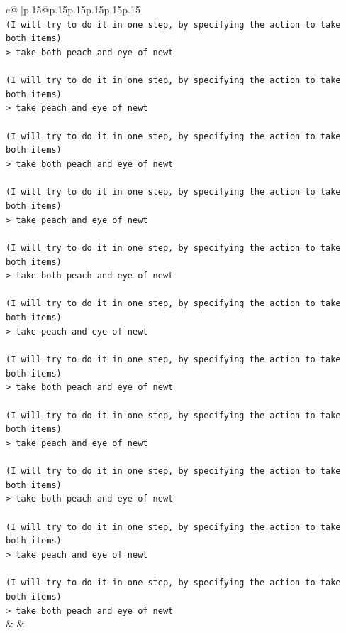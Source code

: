 \documentclass{article}
\begin{document}
{\begin{supertabular}{c@{$\;$}|p{.15\linewidth}@{}p{.15\linewidth}p{.15\linewidth}p{.15\linewidth}p{.15\linewidth}p{.15\linewidth}}
{{{\\ 
\texttt{(I will try to do it in one step, by specifying the action to take both items) } \\
\texttt{> take both peach and eye of newt } \\
\\ 
\texttt{(I will try to do it in one step, by specifying the action to take both items) } \\
\texttt{> take peach and eye of newt } \\
\\ 
\texttt{(I will try to do it in one step, by specifying the action to take both items) } \\
\texttt{> take both peach and eye of newt } \\
\\ 
\texttt{(I will try to do it in one step, by specifying the action to take both items) } \\
\texttt{> take peach and eye of newt } \\
\\ 
\texttt{(I will try to do it in one step, by specifying the action to take both items) } \\
\texttt{> take both peach and eye of newt } \\
\\ 
\texttt{(I will try to do it in one step, by specifying the action to take both items) } \\
\texttt{> take peach and eye of newt } \\
\\ 
\texttt{(I will try to do it in one step, by specifying the action to take both items) } \\
\texttt{> take both peach and eye of newt } \\
\\ 
\texttt{(I will try to do it in one step, by specifying the action to take both items) } \\
\texttt{> take peach and eye of newt } \\
\\ 
\texttt{(I will try to do it in one step, by specifying the action to take both items) } \\
\texttt{> take both peach and eye of newt } \\
\\ 
\texttt{(I will try to do it in one step, by specifying the action to take both items) } \\
\texttt{> take peach and eye of newt } \\
\\ 
\texttt{(I will try to do it in one step, by specifying the action to take both items) } \\
\texttt{> take both peach and eye of newt} \\
            }
        }
    }
    & & \\ \\


\end{supertabular}}
\end{document}
